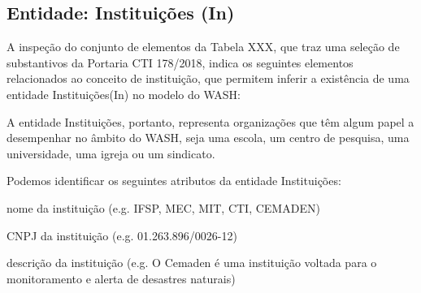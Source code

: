 \documentclass[
12pt,		%
openright,	%
twoside,  %
a4paper,			%
chapter=TITLE,		%
english,			%
french,				%
spanish,			%
brazil				%
]{USPSC-classe/USPSC}
\begin{document}
\subsection[Entidade: Institui\c{c}\~oes (In)]{Entidade: Institui\c{c}\~oes (In)}\label{Entidade: Institui\c{c}\~oes (In)}
A inspe\c{c}\~ao do conjunto de elementos da Tabela XXX, que traz uma sele\c{c}\~ao de substantivos da Portaria CTI 178/2018, indica os seguintes elementos relacionados ao conceito de \textquotedbl institui\c{c}\~ao\textquotedbl , que permitem inferir a exist\^encia de uma entidade \textquotedbl Institui\c{c}\~oes\textquotedbl  (In) no modelo do WASH:











\noindent\begin{center}\mbox{\centering{}}\end{center}


A entidade \textquotedbl Institui\c{c}\~oes\textquotedbl , portanto, representa organiza\c{c}\~oes que t\^em algum papel a desempenhar no \^ambito do WASH, seja uma escola, um centro de pesquisa, uma universidade, uma igreja ou um sindicato.










Podemos identificar os seguintes atributos da entidade \textquotedbl Institui\c{c}\~oes\textquotedbl :











\begin{alineas}
\item nome da institui\c{c}\~ao (e.g. IFSP, MEC, MIT, CTI, CEMADEN)
\item CNPJ da institui\c{c}\~ao (e.g.  01.263.896/0026-12)
\item descri\c{c}\~ao da institui\c{c}\~ao (e.g. \textquotedbl O Cemaden \'e uma institui\c{c}\~ao voltada para o monitoramento e alerta de desastres naturais\textquotedbl )
\end{alineas}
\end{document}

